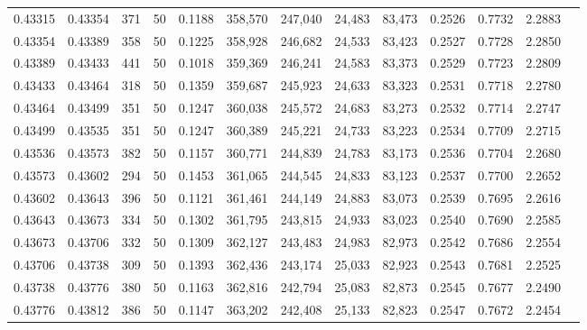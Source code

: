 \begin{tabular}{rrrrrrrrrrrrr}
0.43315 & 0.43354 &   371 &  50 &                                     0.1188 & 358,570 & 247,040 &  24,483 &  83,473 & 0.2526 & 0.7732 & 2.2883 \\
0.43354 & 0.43389 &   358 &  50 &                                     0.1225 & 358,928 & 246,682 &  24,533 &  83,423 & 0.2527 & 0.7728 & 2.2850 \\
0.43389 & 0.43433 &   441 &  50 &                                     0.1018 & 359,369 & 246,241 &  24,583 &  83,373 & 0.2529 & 0.7723 & 2.2809 \\
0.43433 & 0.43464 &   318 &  50 &                                     0.1359 & 359,687 & 245,923 &  24,633 &  83,323 & 0.2531 & 0.7718 & 2.2780 \\
0.43464 & 0.43499 &   351 &  50 &                                     0.1247 & 360,038 & 245,572 &  24,683 &  83,273 & 0.2532 & 0.7714 & 2.2747 \\
0.43499 & 0.43535 &   351 &  50 &                                     0.1247 & 360,389 & 245,221 &  24,733 &  83,223 & 0.2534 & 0.7709 & 2.2715 \\
0.43536 & 0.43573 &   382 &  50 &                                     0.1157 & 360,771 & 244,839 &  24,783 &  83,173 & 0.2536 & 0.7704 & 2.2680 \\
0.43573 & 0.43602 &   294 &  50 &                                     0.1453 & 361,065 & 244,545 &  24,833 &  83,123 & 0.2537 & 0.7700 & 2.2652 \\
0.43602 & 0.43643 &   396 &  50 &                                     0.1121 & 361,461 & 244,149 &  24,883 &  83,073 & 0.2539 & 0.7695 & 2.2616 \\
0.43643 & 0.43673 &   334 &  50 &                                     0.1302 & 361,795 & 243,815 &  24,933 &  83,023 & 0.2540 & 0.7690 & 2.2585 \\
0.43673 & 0.43706 &   332 &  50 &                                     0.1309 & 362,127 & 243,483 &  24,983 &  82,973 & 0.2542 & 0.7686 & 2.2554 \\
0.43706 & 0.43738 &   309 &  50 &                                     0.1393 & 362,436 & 243,174 &  25,033 &  82,923 & 0.2543 & 0.7681 & 2.2525 \\
0.43738 & 0.43776 &   380 &  50 &                                     0.1163 & 362,816 & 242,794 &  25,083 &  82,873 & 0.2545 & 0.7677 & 2.2490 \\
0.43776 & 0.43812 &   386 &  50 &                                     0.1147 & 363,202 & 242,408 &  25,133 &  82,823 & 0.2547 & 0.7672 & 2.2454 \\

\end{tabular}
